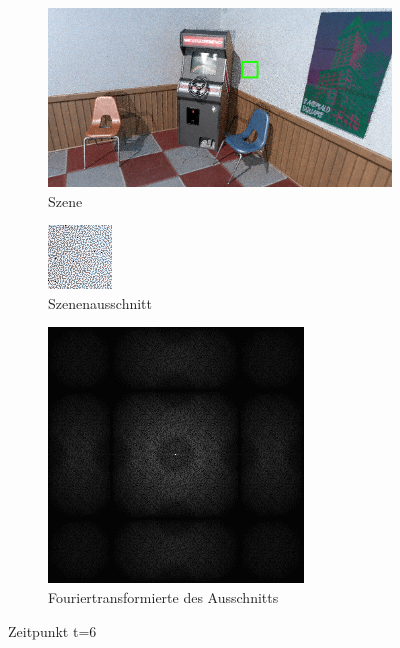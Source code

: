 \begin{figure}[H]
    \begin{subfigure}{\textwidth}   
        \centering \includegraphics[scale=.25]{content/TemporalerAlg/Bilder/Retargeting/Szene/Szene6.png}
        \caption{Szene}
        \label{fig:Retargeting_And_Sorting_Szene_t6}
    \end{subfigure}
    \begin{subfigure}{0.5\textwidth}
        \centering\includegraphics[width=0.4\linewidth]{content/TemporalerAlg/Bilder/Retargeting/Ausschnitt/Ausschnitt6.png} 
        \caption{Szenenausschnitt}
        \label{fig:Retargeting_And_Sorting_ausschnitt_t6}
    \end{subfigure}
    \begin{subfigure}{0.5\textwidth}
        \centering\includegraphics[width=0.4\linewidth]{content/TemporalerAlg/Bilder/Retargeting/Spektren/Ausschnitt6.png}
        \caption{Fouriertransformierte des Ausschnitts}
        \label{fig:Retargeting_And_Sorting_Fouriertransformierte_t6}
    \end{subfigure}
        \caption{Zeitpunkt t=6}
        \label{fig:Retargeting_And_Sorting_Verlauf_t6}
\end{figure}

